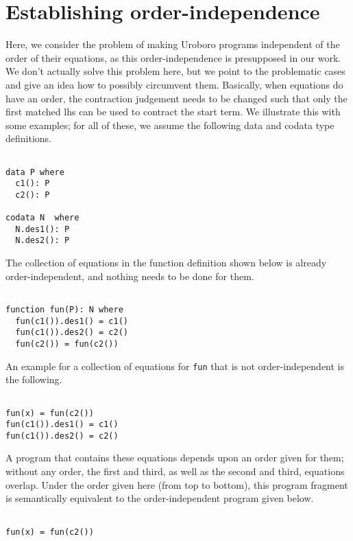 \chapter{Establishing order-independence}

Here, we consider the problem of making Uroboro programs independent of the order of their equations, as this order-independence is presupposed in our work. We don't actually solve this problem here, but we point to the problematic cases and give an idea how to possibly circumvent them. Basically, when equations do have an order, the contraction judgement needs to be changed such that only the first matched lhs can be used to contract the start term. We illustrate this with some examples; for all of these, we assume the following data and codata type definitions.

\begin{lstlisting}

data P where
  c1(): P
  c2(): P

codata N  where
  N.des1(): P
  N.des2(): P

\end{lstlisting}

The collection of equations in the function definition shown below is already order-independent, and nothing needs to be done for them.

\begin{lstlisting}

function fun(P): N where
  fun(c1()).des1() = c1()
  fun(c1()).des2() = c2()
  fun(c2()) = fun(c2())

\end{lstlisting}

An example for a collection of equations for \texttt{fun} that is not order-independent is the following.

\begin{lstlisting}

fun(x) = fun(c2())
fun(c1()).des1() = c1()
fun(c1()).des2() = c2()

\end{lstlisting}

A program that contains these equations depends upon an order given for them; without any order, the first and third, as well as the second and third, equations overlap. Under the order given here (from top to bottom), this program fragment is semantically equivalent to the order-independent program given below.

\begin{lstlisting}

fun(x) = fun(c2())

\end{lstlisting}

